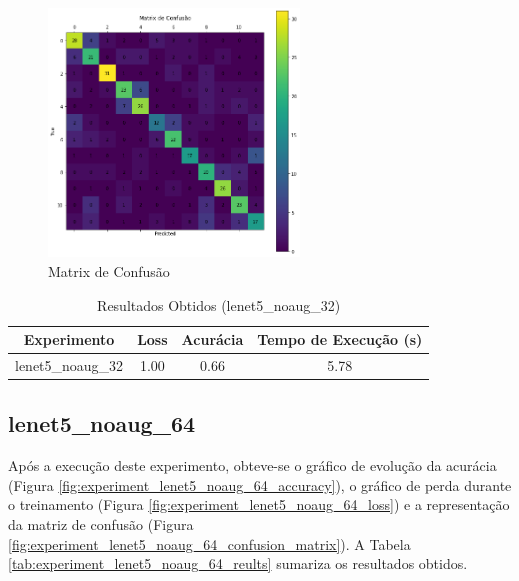 \documentclass[12pt]{article}
\begin{document}
\begin{figure}[!htb]
  \centering
  \includegraphics[width=18em]{experiments/lenet5_noaug_32/confusion_matrix.png}
  \caption{Matrix de Confusão}
  \label{fig:experiment_lenet5_noaug_32_confusion_matrix}
\end{figure}

\begin{table}[!htb]
  \centering
  \begin{tabular}{|c|c|c|c|}
    \hline
    \textbf{Experimento} & \textbf{Loss} & \textbf{Acurácia} & \textbf{Tempo de Execução (s)} \\ \hline
    lenet5\_noaug\_32    & 1.00          & 0.66              & 5.78                           \\ \hline
  \end{tabular}
  \caption{Resultados Obtidos (lenet5\_noaug\_32)}
  \label{tab:experiment_lenet5_noaug_32_reults}
\end{table}

\newpage

\subsection{lenet5\_noaug\_64}

Após a execução deste experimento, obteve-se o gráfico de evolução da acurácia (Figura \ref{fig:experiment_lenet5_noaug_64_accuracy}), o gráfico de perda durante o treinamento (Figura \ref{fig:experiment_lenet5_noaug_64_loss}) e a representação da matriz de confusão (Figura \ref{fig:experiment_lenet5_noaug_64_confusion_matrix}). A Tabela \ref{tab:experiment_lenet5_noaug_64_reults} sumariza os resultados obtidos.
\end{document}
